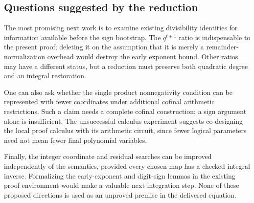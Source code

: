 \documentclass[11pt,letterpaper]{article}
\begin{document}
\subsection{Questions suggested by the reduction}

The most promising next work is to examine existing divisibility
identities for information available before the sign bootstrap.
The $q^{t+1}$ ratio is indispensable to the present proof; deleting
it on the assumption that it is merely a remainder-normalization
overhead would destroy the early exponent bound.
Other ratios may have a different status, but a reduction must
preserve both quadratic degree and an integral restoration.

One can also ask whether the single product nonnegativity condition
can be represented with fewer coordinates under additional cofinal
arithmetic restrictions. Such a claim needs a complete cofinal
construction; a sign argument alone is insufficient.
The unsuccessful calculus experiment suggests co-designing the
local proof calculus with its arithmetic circuit, since fewer
logical parameters need not mean fewer final polynomial variables.

Finally, the integer coordinate and residual searches can be improved
independently of the semantics, provided every chosen map has a
checked integral inverse. Formalizing the early-exponent and
digit-sign lemmas in the existing proof environment would make a
valuable next integration step. None of these proposed directions
is used as an unproved premise in the delivered equation.
\end{document}
